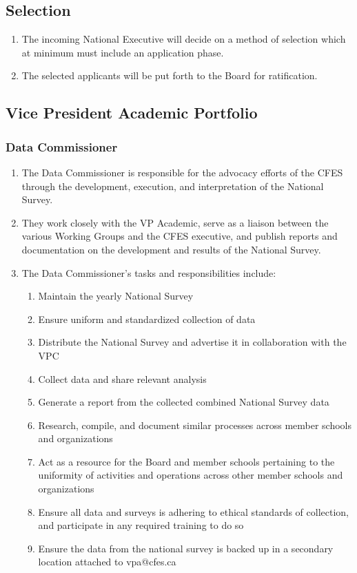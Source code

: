 \subsection{Selection}
\label{selection}

\begin{enumerate}
 \item
  The incoming National Executive will decide on a method of selection which at minimum must include an application phase.
 \item
  The selected applicants will be put forth to the Board for ratification.
\end{enumerate}

\subsection{Vice President Academic Portfolio}
\label{vpa-portfolio}

\subsubsection{Data Commissioner}
\label{data-commissioner}

\begin{enumerate}
 \item
  The Data Commissioner is responsible for the advocacy efforts of the CFES through the development, execution, and interpretation of the National Survey.
 \item
  They work closely with the VP Academic, serve as a liaison between the various Working Groups and the CFES executive, and publish reports and documentation on the development and results of the National Survey.
 \item
  The Data Commissioner’s tasks and responsibilities include:

  \begin{enumerate}
   \item
    Maintain the yearly National Survey
   \item
    Ensure uniform and standardized collection of data
   \item
    Distribute the National Survey and advertise it in collaboration with the VPC
   \item
    Collect data and share relevant analysis
   \item
    Generate a report from the collected combined National Survey data
   \item
    Research, compile, and document similar processes across member schools and organizations
   \item
    Act as a resource for the Board and member schools pertaining to the uniformity of activities and operations across other member schools and organizations
   \item
    Ensure all data and surveys is adhering to ethical standards of collection, and participate in any required training to do so
   \item
    Ensure the data from the national survey is backed up in a secondary location attached to vpa@cfes.ca
  \end{enumerate}
\end{enumerate}

